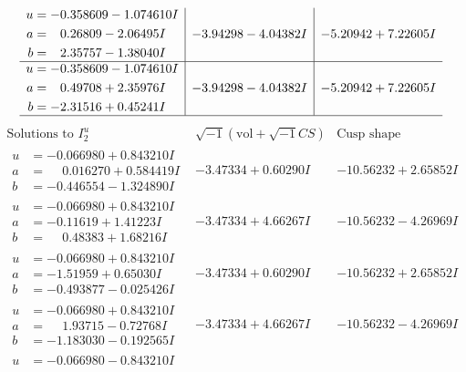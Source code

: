 \documentclass[1p]{elsarticle_modified}
\theoremstyle{definition}
\newcommand{\I}{\sqrt{-1}}
\begin{document}
$$\begin{array}{c|c|c}
\begin{aligned}
u &= -0.358609 - 1.074610 I \\
a &= \phantom{-}0.26809 - 2.06495 I \\
b &= \phantom{-}2.35757 - 1.38040 I\end{aligned}
 & -3.94298 - 4.04382 I & -5.20942 + 7.22605 I \\ \hline\begin{aligned}
u &= -0.358609 - 1.074610 I \\
a &= \phantom{-}0.49708 + 2.35976 I \\
b &= -2.31516 + 0.45241 I\end{aligned}
 & -3.94298 - 4.04382 I & -5.20942 + 7.22605 I\\
 \hline 
 \end{array}$$\newpage$$\begin{array}{c|c|c}  
\text{Solutions to }I^u_{2}& \I (\text{vol} + \sqrt{-1}CS) & \text{Cusp shape}\\
 \hline 
\begin{aligned}
u &= -0.066980 + 0.843210 I \\
a &= \phantom{-}0.016270 + 0.584419 I \\
b &= -0.446554 - 1.324890 I\end{aligned}
 & -3.47334 + 0.60290 I & -10.56232 + 2.65852 I \\ \hline\begin{aligned}
u &= -0.066980 + 0.843210 I \\
a &= -0.11619 + 1.41223 I \\
b &= \phantom{-}0.48383 + 1.68216 I\end{aligned}
 & -3.47334 + 4.66267 I & -10.56232 - 4.26969 I \\ \hline\begin{aligned}
u &= -0.066980 + 0.843210 I \\
a &= -1.51959 + 0.65030 I \\
b &= -0.493877 - 0.025426 I\end{aligned}
 & -3.47334 + 0.60290 I & -10.56232 + 2.65852 I \\ \hline\begin{aligned}
u &= -0.066980 + 0.843210 I \\
a &= \phantom{-}1.93715 - 0.72768 I \\
b &= -1.183030 - 0.192565 I\end{aligned}
 & -3.47334 + 4.66267 I & -10.56232 - 4.26969 I \\ \hline\begin{aligned}
u &= -0.066980 - 0.843210 I \\

\end{aligned}
\end{array}$$
\end{document}
